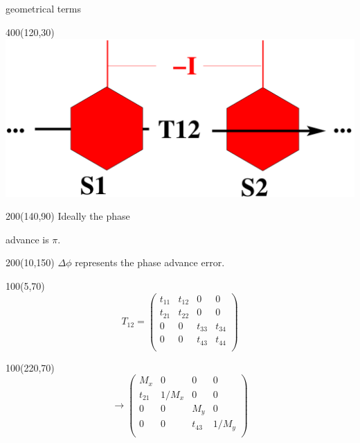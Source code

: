 \documentclass{beamer}
\begin{document}
\begin{frame}{geometrical terms}
 \setlength{\TPHorizModule}{1pt}
  \setlength{\TPVertModule}{1pt}
  \begin{textblock}{400}(120,30)
 \includegraphics[scale=0.20,angle=0]{geo_cancel.pdf}
\end{textblock}
  \begin{textblock}{200}(140,90)
 Ideally the phase\par
 advance is $\pi$.
 \end{textblock}
 \begin{textblock}{200}(10,150)
 $\Delta\phi$ represents the phase advance {\color{red}error}.
 \end{textblock}
  \begin{textblock}{100}(5,70)
  \begin{equation*}
 T_{12}=
  \begin{pmatrix}
   t_{11} & t_{12} & 0 & 0 \\
   t_{21} & t_{22} & 0 & 0 \\
   0 & 0 & t_{33} & t_{34} \\
   0 & 0 & t_{43} & t_{44} \\
  \end{pmatrix}
 \end{equation*}
 \end{textblock}
   \begin{textblock}{100}(220,70)
  \begin{equation*}
 \rightarrow
  \begin{pmatrix}
   M_x & 0 & 0 & 0 \\
   t_{21} & 1/M_x & 0 & 0 \\
   0 & 0 & M_y & 0 \\
   0 & 0 & t_{43} & 1/M_y \\
  \end{pmatrix}
 \end{equation*}

\end{textblock}
\end{frame}
\end{document}
